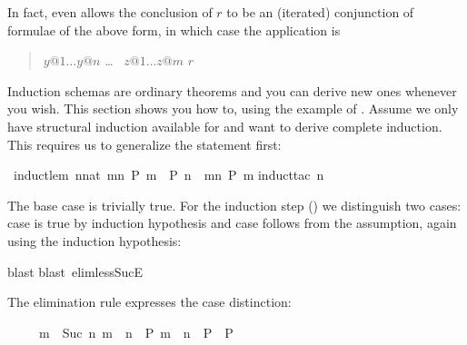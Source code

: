 \begin{isabellebody}
\begin{isamarkuptext}
In fact,  even allows the conclusion of
$r$ to be an (iterated) conjunction of formulae of the above form, in
which case the application is
\begin{quote}
 $y@1 \dots y@n$  \dots\  $z@1 \dots z@m$  $r$\isa{{\isacharparenright}}
\end{quote}%
\end{isamarkuptext}%
%
%
\begin{isamarkuptext}%
\label{sec:derive-ind}
Induction schemas are ordinary theorems and you can derive new ones
whenever you wish.  This section shows you how to, using the example
of . Assume we only have structural induction
available for  and want to derive complete induction. This
requires us to generalize the statement first:%
\end{isamarkuptext}%
\ induct{\isacharunderscore}lem{\isacharcolon}\ {\isachardoublequote}{\isacharparenleft}{\isasymAnd}n{\isacharcolon}{\isacharcolon}nat{\isachardot}\ {\isasymforall}m{\isacharless}n{\isachardot}\ P\ m\ {\isasymLongrightarrow}\ P\ n{\isacharparenright}\ {\isasymLongrightarrow}\ {\isasymforall}m{\isacharless}n{\isachardot}\ P\ m{\isachardoublequote}\isanewline
{}induct{\isacharunderscore}tac\ n{\isacharparenright}%
\begin{isamarkuptxt}%
\noindent
The base case is trivially true. For the induction step () we distinguish two cases: case  is true by induction
hypothesis and case  follows from the assumption, again using
the induction hypothesis:%
\end{isamarkuptxt}%
blast{\isacharparenright}\isanewline
{}blast\ elim{\isacharcolon}less{\isacharunderscore}SucE{\isacharparenright}%
\begin{isamarkuptext}%
\noindent
The elimination rule  expresses the case distinction:
\begin{isabelle}%
\ \ \ \ \ {\isasymlbrakk}m\ {\isacharless}\ Suc\ n{\isacharsemicolon}\ m\ {\isacharless}\ n\ {\isasymLongrightarrow}\ P{\isacharsemicolon}\ m\ {\isacharequal}\ n\ {\isasymLongrightarrow}\ P{\isasymrbrakk}\ {\isasymLongrightarrow}\ P%
\end{isabelle}


\end{isamarkuptext}
\end{isabellebody}
